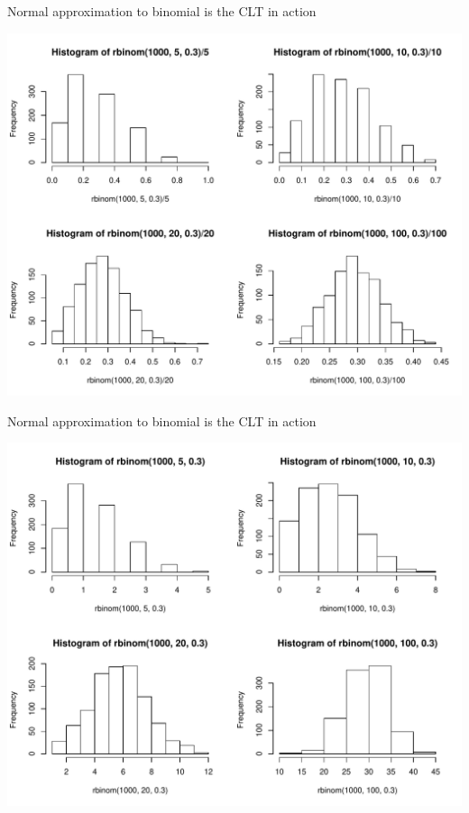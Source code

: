 \documentclass{beamer}\usepackage[]{graphicx}\usepackage[]{color}
\newenvironment{knitrout}{}{} %
\begin{document}
\begin{frame}[fragile]{Normal approximation to binomial is the CLT in action}
\begin{knitrout}\scriptsize
{}\color{fgcolor}

{\centering \includegraphics[width=1\linewidth]{figure/unnamed-chunk-4-1} 

}



\end{knitrout}
\end{frame}


\begin{frame}[fragile]{Normal approximation to binomial is the CLT in action}
\begin{knitrout}\scriptsize
{}\color{fgcolor}

{\centering \includegraphics[width=1\linewidth]{figure/unnamed-chunk-5-1} 

}



\end{knitrout}
\end{frame}
\end{document}
